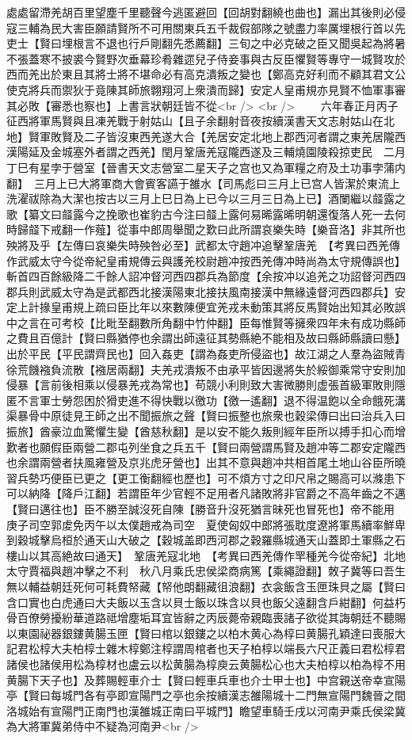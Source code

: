 處處留滯羌胡百里望塵千里聽聲今逃匿避回【回胡對翻繞也曲也】漏出其後則必侵寇三輔為民大害臣願請賢所不可用關東兵五千裁假部隊之號盡力率厲埋根行首以先吏士【賢曰埋根言不退也行戶剛翻先悉薦翻】三旬之中必克破之臣又聞吳起為將暑不張蓋寒不披裘今賢野次垂幕珍肴雜遝兒子侍妾事與古反臣懼賢等專守一城賢攻於西而羌出於東且其將士將不堪命必有高克潰叛之變也【鄭高克好利而不顧其君文公使克將兵而禦狄于竟陳其師旅翺翔河上衆潰而歸】安定人皇甫規亦見賢不恤軍事審其必敗【審悉也察也】上書言狀朝廷皆不從<br />
<br />
　　六年春正月丙子征西將軍馬賢與且凍羌戰于射姑山【且子余翻射音夜按續漢書天文志射姑山在北地】賢軍敗賢及二子皆沒東西羌遂大合【羌居安定北地上郡西河者謂之東羌居隴西漢陽延及金城塞外者謂之西羌】閏月鞏唐羌寇隴西遂及三輔燒園陵殺掠吏民　二月丁巳有星孛于營室【晉書天文志營室二星天子之宫也又為軍糧之府及土功事孛蒲内翻】　三月上已大將軍商大會賓客讌于雒水【司馬彪曰三月上已宫人皆潔於東流上洗濯祓除為大潔也按古以三月上巳日為上已今以三月三日為上已】酒闌繼以䪥露之歌【纂文曰䪥露今之挽歌也崔豹古今注曰䪥上露何易晞露晞明朝還復落人死一去何時歸䪥下戒翻一作薤】從事中郎周舉聞之歎曰此所謂哀樂失時【樂音洛】非其所也殃將及乎【左傳曰哀樂失時殃咎必至】武都太守趙冲追擊鞏唐羌　【考異曰西羌傳作武威太守今從帝紀皇甫規傳云與護羌校尉趙冲按西羌傳冲時尚為太守規傳誤也】斬首四百餘級降二千餘人詔冲督河西四郡兵為節度【余按冲以追羌之功詔督河西四郡兵則武威太守為是武都西北接漢陽東北接扶風南接漢中無緣遠督河西四郡兵】安定上計掾皇甫規上疏曰臣比年以來數陳便宜羌戎未動策其將反馬賢始出知其必敗誤中之言在可考校【比毗至翻數所角翻中竹仲翻】臣每惟賢等擁衆四年未有成功縣師之費且百億計【賢曰縣猶停也余謂出師遠征其勢縣絶不能相及故曰縣師縣讀曰懸】出於平民【平民謂齊民也】回入姦吏【謂為姦吏所侵盜也】故江湖之人羣為盜賊青徐荒饑襁負流散【襁居兩翻】夫羌戎潰叛不由承平皆因邊將失於綏御乘常守安則加侵暴【言前後相乘以侵暴羌戎為常也】苟競小利則致大害微勝則虚張首級軍敗則隱匿不言軍士勞怨困於猾吏進不得快戰以徼功【徼一遙翻】退不得温飽以全命餓死溝渠暴骨中原徒見王師之出不聞振旅之聲【賢曰振整也旅衆也穀梁傳曰出曰治兵入曰振旅】酋豪泣血驚懼生變【酋慈秋翻】是以安不能久叛則經年臣所以搏手扣心而增歎者也願假臣兩營二郡屯列坐食之兵五千【賢曰兩營謂馬賢及趙冲等二郡安定隴西也余謂兩營者扶風雍營及京兆虎牙營也】出其不意與趙冲共相首尾土地山谷臣所曉習兵勢巧便臣已更之【更工衡翻經也歷也】可不煩方寸之印尺帛之賜高可以滌患下可以納降【降戶江翻】若謂臣年少官輕不足用者凡諸敗將非官爵之不高年齒之不邁【賢曰邁往也】臣不勝至誠沒死自陳【勝音升沒死猶言昧死也冒死也】帝不能用　庚子司空郭䖍免丙午以太僕趙戒為司空　夏使匈奴中郎將張耽度遼將軍馬續率鮮卑到穀城擊烏桓於通天山大破之【穀城盖即西河郡之穀羅縣城通天山蓋即土軍縣之石樓山以其高絶故曰通天】　鞏唐羌寇北地　【考異曰西羌傳作䍐種羌今從帝紀】北地太守賈福與趙冲擊之不利　秋八月乘氏忠侯梁商病篤【乘繩證翻】敇子冀等曰吾生無以輔益朝廷死何可耗費帑藏【帑他朗翻藏徂浪翻】衣衾飯含玉匣珠貝之屬【賢曰含口實也白虎通曰大夫飯以玉含以貝士飯以珠含以貝也飯父遠翻含戶紺翻】何益朽骨百僚勞擾紛華道路祗增塵垢耳宜皆辭之丙辰薨帝親臨喪諸子欲從其誨朝廷不聽賜以東園祕器銀鏤黄腸玉匣【賢曰棺以銀鏤之以柏木黄心為椁曰黄腸孔穎達曰喪服大記君松椁大夫柏椁士雜木椁鄭注椁謂周棺者也天子柏椁以端長六尺正義曰君松椁君諸侯也諸侯用松為椁材也盧云以松黄腸為椁庾云黄腸松心也大夫柏椁以柏為椁不用黄腸下天子也】及葬賜輕車介士【賢曰輕車兵車也介士甲士也】中宫親送帝幸宣陽亭【賢曰每城門各有亭即宣陽門之亭也余按續漢志雒陽城十二門無宣陽門魏晉之間洛城始有宣陽門正南門也漢雒城正南曰平城門】瞻望車騎壬戌以河南尹乘氏侯梁冀為大將軍冀弟侍中不疑為河南尹<br />
